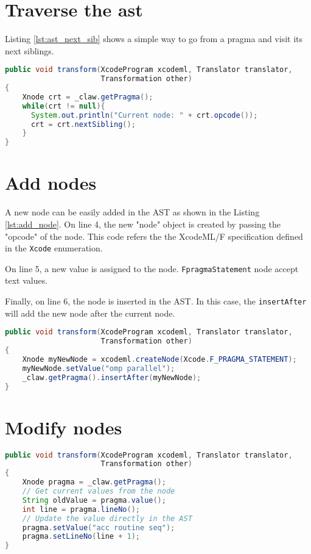 \section{Traverse the \gls{ast}}
Listing \ref{lst:ast_next_sib} shows a simple way to go from a pragma and visit 
its next siblings.

\begin{lstlisting}[label=lst:ast_next_sib, language=Java, caption=XcodeML/F AST traverse]
public void transform(XcodeProgram xcodeml, Translator translator,
                      Transformation other)
{
    Xnode crt = _claw.getPragma();
    while(crt != null){
      System.out.println("Current node: " + crt.opcode());
      crt = crt.nextSibling();
    }
}
\end{lstlisting}

\section{Add nodes}
A new node can be easily added in the AST as shown in the Listing 
\ref{lst:add_node}. On line 4, the new "node" object is created by
passing the "opcode" of the node. This code refers the the XcodeML/F 
specification defined in the \lstinline!Xcode! enumeration.

On line 5, a new value is assigned to the node. \lstinline!FpragmaStatement! 
node accept text values.

Finally, on line 6, the node is inserted in the AST. In this case, 
the \lstinline!insertAfter! will add the new node after the current node.

\begin{lstlisting}[label=lst:add_node, language=Java, caption=XcodeML/F add node example]
public void transform(XcodeProgram xcodeml, Translator translator,
                      Transformation other)
{
    Xnode myNewNode = xcodeml.createNode(Xcode.F_PRAGMA_STATEMENT);
    myNewNode.setValue("omp parallel");
    _claw.getPragma().insertAfter(myNewNode);
}
\end{lstlisting}

\section{Modify nodes}

\begin{lstlisting}[label=lst:update_node, language=Java, caption=XcodeML/F update node example]
public void transform(XcodeProgram xcodeml, Translator translator,
                      Transformation other)
{
    Xnode pragma = _claw.getPragma();
    // Get current values from the node
    String oldValue = pragma.value();
    int line = pragma.lineNo();
    // Update the value directly in the AST
    pragma.setValue("acc routine seq");
    pragma.setLineNo(line + 1);
}
\end{lstlisting}

